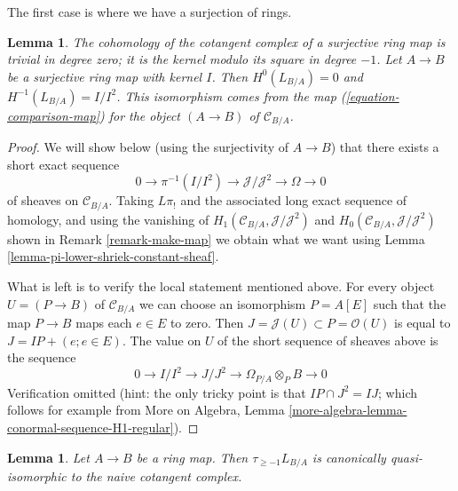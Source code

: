 \documentclass{stacks-project}
\newenvironment{slogan}{\comment}{\endcomment}
\theoremstyle{plain}
\newtheorem{lemma}[subsection]{Lemma}
\theoremstyle{definition}
\theoremstyle{remark}
\numberwithin{equation}{subsection}
\begin{document}
\noindent
The first case is where we have a surjection of rings.

\begin{lemma}
\label{lemma-surjection}
\begin{slogan}
The cohomology of the cotangent complex of a surjective ring map is trivial in
degree zero; it is the kernel modulo its square in degree $-1$.
\end{slogan}
Let $A \to B$ be a surjective ring map with kernel $I$.
Then $H^0(L_{B/A}) = 0$ and $H^{-1}(L_{B/A}) = I/I^2$.
This isomorphism comes from the map (\ref{equation-comparison-map})
for the object $(A \to B)$ of $\mathcal{C}_{B/A}$.
\end{lemma}

\begin{proof}
We will show below (using the surjectivity of $A \to B$)
that there exists a short exact sequence
$$
0 \to \pi^{-1}(I/I^2) \to \mathcal{J}/\mathcal{J}^2 \to \Omega \to 0
$$
of sheaves on $\mathcal{C}_{B/A}$. Taking $L\pi_!$ and
the associated long exact sequence of homology, and using the
vanishing of $H_1(\mathcal{C}_{B/A}, \mathcal{J}/\mathcal{J}^2)$ and
$H_0(\mathcal{C}_{B/A}, \mathcal{J}/\mathcal{J}^2)$
shown in Remark \ref{remark-make-map} we obtain what we want using
Lemma \ref{lemma-pi-lower-shriek-constant-sheaf}.

\medskip\noindent
What is left is to verify the local statement mentioned above.
For every object $U = (P \to B)$ of $\mathcal{C}_{B/A}$
we can choose an isomorphism $P = A[E]$ such that the map
$P \to B$ maps each $e \in E$ to zero. Then
$J = \mathcal{J}(U) \subset P = \mathcal{O}(U)$
is equal to $J = IP + (e; e \in E)$. The value on $U$ of the short sequence
of sheaves above is the sequence
$$
0 \to I/I^2 \to J/J^2 \to \Omega_{P/A} \otimes_P B \to 0
$$
Verification omitted (hint: the only tricky point is that
$IP \cap J^2 = IJ$; which follows for example from
More on Algebra, Lemma \ref{more-algebra-lemma-conormal-sequence-H1-regular}).
\end{proof}

\begin{lemma}
\label{lemma-relation-with-naive-cotangent-complex}
Let $A \to B$ be a ring map. Then $\tau_{\geq -1}L_{B/A}$
is canonically quasi-isomorphic to the naive cotangent complex.
\end{lemma}
\end{document}
